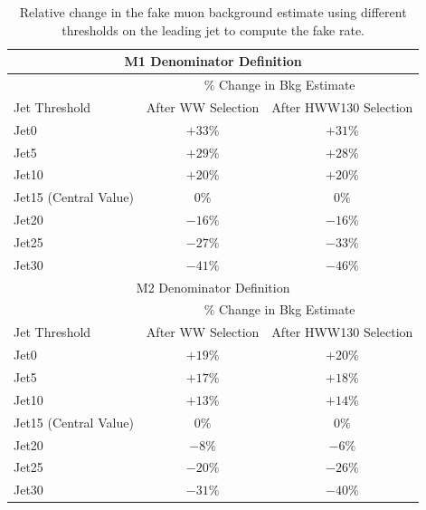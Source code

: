 \begin{table}[!htbp]
\begin{center}
\begin{tabular}{|l|c|c|}
\hline
\multicolumn{3}{|c|}{ M1 Denominator Definition} \\
\hline
                        & \multicolumn{2}{|c|}{ $\%$ Change in Bkg Estimate} \\
\hline
Jet Threshold           & After WW Selection  & After HWW130 Selection \\
\hline
Jet0                    &  $+33\%$     & $+31\%$     \\
Jet5                    &  $+29\%$     & $+28\%$     \\
Jet10                   &  $+20\%$     & $+20\%$     \\
Jet15 (Central Value)   &  $0\%$       & $0\%$       \\
Jet20                   &  $-16\%$     & $-16\%$     \\
Jet25                   &  $-27\%$     & $-33\%$     \\
Jet30                   &  $-41\%$     & $-46\%$     \\
\hline

\hline
\multicolumn{3}{|c|}{ M2 Denominator Definition} \\
\hline
                        & \multicolumn{2}{|c|}{ $\%$ Change in Bkg Estimate} \\
\hline
Jet Threshold           & After WW Selection  & After HWW130 Selection \\
\hline

Jet0                    &  $+19\%$     & $+20\%$     \\
Jet5                    &  $+17\%$     & $+18\%$   \\
Jet10                   &  $+13\%$     & $+14\%$   \\
Jet15 (Central Value)   &  $0\%$       & $0\%$     \\
Jet20                   &  $-8\%$     & $-6\%$     \\
Jet25                   &  $-20\%$     & $-26\%$   \\
Jet30                   &  $-31\%$     & $-40\%$   \\

\hline

\hline
\end{tabular}
\caption{Relative change in the fake muon background estimate using different thresholds on the leading jet to compute the fake rate. }
\label{tab:mu_fr_JetSpectrumSystematics}
\end{center}
\end{table}




